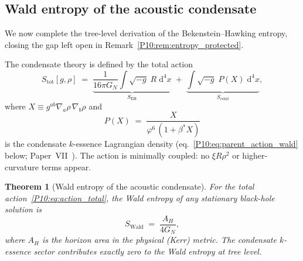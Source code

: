 \documentclass[11pt,a4paper]{article}
\newtheorem{theorem}{Theorem}[section]
\theoremstyle{definition}
\theoremstyle{remark}
\newcommand{\vp}{\varphi}
\newcommand{\bst}{\beta^{*}}
\begin{document}
\subsection{Wald entropy of the acoustic condensate}
\label{P10:sec:wald}

We now complete the tree-level derivation of the Bekenstein--Hawking
entropy, closing the gap left open in Remark~\ref{P10:rem:entropy_protected}.

The condensate theory is defined by the total action
\begin{equation}
  S_\mathrm{tot}[g,\rho]
  \;=\; \underbrace{\frac{1}{16\pi G_N}\int\!\sqrt{-g}\;R\;\mathrm{d}^4x}_{S_\mathrm{EH}}
  \;+\; \underbrace{\int\!\sqrt{-g}\;P(X)\;\mathrm{d}^4x}_{S_\mathrm{cond}},
  \label{P10:eq:action_total}
\end{equation}
where $X \equiv g^{ab}\nabla_{\!a}\rho\,\nabla_{\!b}\rho$ and
\begin{equation}
  P(X) \;=\; \frac{X}{\vp^6\,(1+\bst X)}
  \label{P10:eq:parent_action_wald}
\end{equation}
is the condensate $k$-essence Lagrangian density
(eq.~\eqref{P10:eq:parent_action_wald} below; Paper~VII~\cite{Paper7}).
The action is minimally coupled: no $\xi R\rho^2$ or higher-curvature
terms appear.

\begin{theorem}[Wald entropy of the acoustic condensate]
\label{P10:thm:wald}
For the total action~\eqref{P10:eq:action_total}, the Wald entropy of any
stationary black-hole solution is
\begin{equation}
  \boxed{S_\mathrm{Wald}
  \;=\; \frac{A_H}{4G_N}},
  \label{P10:eq:wald_result}
\end{equation}
where $A_H$ is the horizon area in the physical (Kerr) metric.
The condensate $k$-essence sector contributes exactly zero to the
Wald entropy at tree level.
\end{theorem}
\end{document}
